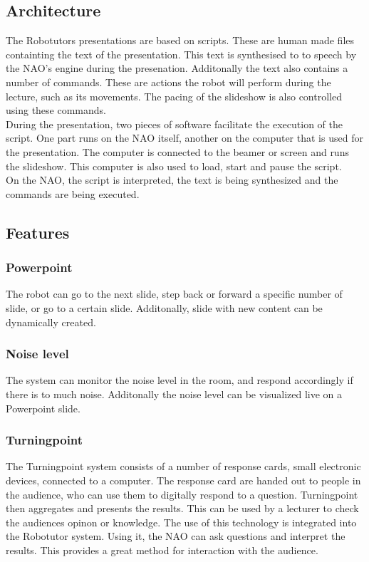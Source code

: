 \subsection{Architecture}
The Robotutors presentations are based on scripts. These are human made files containting the text of the presentation. This text is synthesised to to speech by the NAO's engine during the presenation. Additonally the text also contains a number of commands. These are actions the robot will perform during the lecture, such as its movements. The pacing of the slideshow is also controlled using these commands.\\
During the presentation, two pieces of software facilitate the execution of the script. One part runs on the NAO itself, another on the computer that is used for the presentation. The computer is connected to the beamer or screen and runs the slideshow. This computer is also used to load, start and pause the script.\\


On the NAO, the script is interpreted, the text is being synthesized and the commands are being executed.



\subsection{Features}
\subsubsection{Powerpoint}
The robot can go to the next slide, step back or forward a specific number of slide, or go to a certain slide. Additonally, slide with new content can be dynamically created.

\subsubsection{Noise level}
The system can monitor the noise level in the room, and respond accordingly if there is to much noise. Additonally the noise level can be visualized live on a Powerpoint slide.

\subsubsection{Turningpoint}
The Turningpoint system consists of a number of response cards, small electronic devices, connected to a computer. The response card are handed out to people in the audience, who can use them to digitally respond to a question. Turningpoint then aggregates and presents the results. This can be used by a lecturer to check the audiences opinon or knowledge. The use of this technology is integrated into the Robotutor system. Using it, the NAO can ask questions and interpret the results. This provides a great method for interaction with the audience.

